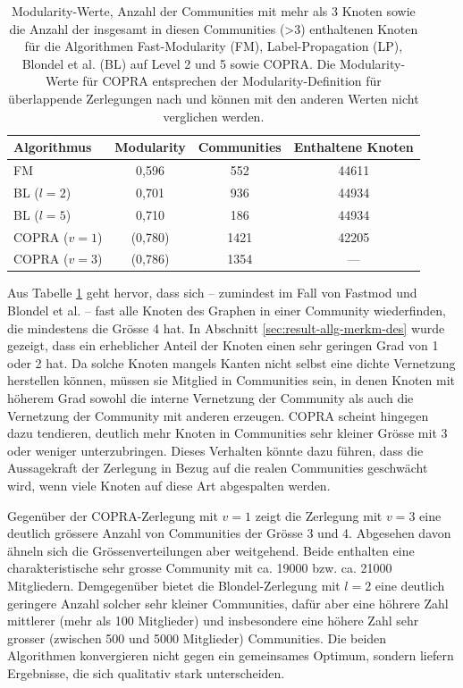\begin{table}[t]
  \centering
  \footnotesize
  \begin{tabular}{l|c|c|c}
    Algorithmus & Modularity & Communities &
    Enthaltene Knoten \\
    \hline
    FM & 0,596 & 552 & 44611 \\
    \hline
    BL ($l=2$)& 0,701 & 936 & 44934 \\
    BL ($l=5$)& 0,710 & 186 & 44934 \\
    \hline
    COPRA ($v=1$) & (0,780) & 1421 & 42205 \\
    COPRA ($v=3$) & (0,786) & 1354 & --- \\

  \end{tabular}
  \caption{Modularity-Werte, Anzahl der Communities mit mehr als 3
    Knoten sowie die Anzahl der insgesamt in diesen Communities (>3) enthaltenen
    Knoten 
    f\"ur die Algorithmen Fast-Modularity (FM), Label-Propagation
    (LP), Blondel et al. (BL) auf Level 2 und 5 sowie COPRA. Die
    Modularity-Werte f\"ur COPRA entsprechen der Modularity-Definition
    f\"ur \"uberlappende Zerlegungen nach \cite{Nicosia2009} und k\"onnen mit den anderen
    Werten nicht verglichen werden.}
  \label{tab:mod-result}
\end{table}

Aus Tabelle \ref{tab:mod-result} geht hervor, dass sich -- zumindest
im Fall von Fastmod und Blondel et al. -- fast alle Knoten des Graphen
in einer Community wiederfinden, die mindestens die Gr\"osse 4 hat. In
Abschnitt \ref{sec:result-allg-merkm-des} wurde gezeigt, dass ein
erheblicher Anteil der Knoten einen sehr geringen Grad von 1 oder 2
hat. Da solche Knoten mangels Kanten nicht selbst eine dichte
Vernetzung herstellen k\"onnen, m\"ussen sie Mitglied in Communities
sein, in denen Knoten mit h\"oherem Grad sowohl die interne Vernetzung
der Community als auch die Vernetzung der Community mit anderen
erzeugen. COPRA scheint hingegen dazu tendieren, deutlich mehr Knoten
in Communities sehr kleiner Gr\"osse mit 3 oder weniger
unterzubringen. Dieses Verhalten k\"onnte dazu f\"uhren, dass die
Aussagekraft der Zerlegung in Bezug auf die realen Communities
geschw\"acht wird, wenn viele Knoten auf diese Art abgespalten werden.

Gegen\"uber der COPRA-Zerlegung mit $v=1$ zeigt die Zerlegung mit
$v=3$ eine deutlich gr\"ossere Anzahl von Communities der Gr\"osse 3
und 4. Abgesehen davon \"ahneln sich die Gr\"ossenverteilungen aber
weitgehend. Beide enthalten eine charakteristische sehr grosse
Community mit ca. 19000 bzw. ca. 21000 Mitgliedern. Demgegen\"uber
bietet die Blondel-Zerlegung mit $l=2$ eine deutlich geringere Anzahl
solcher sehr kleiner Communities, daf\"ur aber eine h\"ohrere Zahl
mittlerer (mehr als 100 Mitglieder) und insbesondere eine h\"ohere
Zahl sehr grosser (zwischen 500 und 5000 Mitglieder) Communities.  Die
beiden Algorithmen konvergieren nicht gegen ein gemeinsames Optimum,
sondern liefern Ergebnisse, die sich qualitativ stark unterscheiden.

